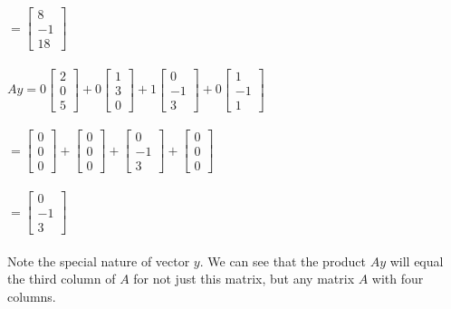 {$ = \left[ \begin{array}{c} 8 \\ -1 \\ 18 \end{array} \right] $ \\ \\
	
$Ay =
0  \left[ \begin{array}{c} 2 \\ 0 \\ 5 \end{array} \right] + 
0  \left[ \begin{array}{c} 1 \\ 3 \\ 0 \end{array} \right] +
1  \left[ \begin{array}{c} 0 \\ -1 \\ 3 \end{array} \right] +
0  \left[ \begin{array}{c} 1 \\ -1  \\ 1 \end{array} \right] $ \\ \\

$ = 
\left[ \begin{array}{c} 0 \\ 0 \\ 0 \end{array} \right] + 
\left[ \begin{array}{c} 0 \\ 0 \\ 0 \end{array} \right] +
\left[ \begin{array}{c} 0 \\ -1 \\ 3 \end{array} \right] +
\left[ \begin{array}{c} 0 \\ 0 \\ 0 \end{array} \right] $ \\ \\

$ = \left[ \begin{array}{c} 0 \\ -1 \\ 3 \end{array} \right] $ \\ \\

Note the special nature of vector $y$. We can see that the product $Ay$ will equal the third column of $A$ for not just this matrix, but any matrix $A$ with four columns. 
	
}


